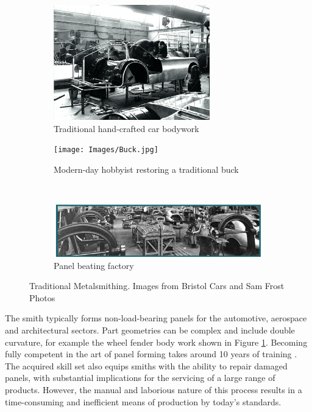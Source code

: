 \begin{figure}[h]
\centering
%
\begin{subfigure}[t]{.45\textwidth}
  \centering
  \includegraphics[height=5cm]{Images/OldCar.png}  
  \caption{Traditional hand-crafted car bodywork}
  \label{fig:OldCar}
\end{subfigure}
\begin{subfigure}[t]{.45\textwidth}
  \centering
  \texttt{[image: Images/Buck.jpg]}  
  \caption{Modern-day hobbyist restoring a traditional buck}
  \label{fig:NewBuck}
\end{subfigure}\\[1ex]
%
\begin{subfigure}{.9\textwidth}
  \centering
  \includegraphics[width=\linewidth]{Images/OldFactory.png}  
  \caption{Panel beating factory}
  \label{fig:OldFactory}
\end{subfigure}
%
\caption{Traditional Metalsmithing. Images from Bristol Cars and Sam Frost Photos}
\label{fig:Background}
\end{figure}

The smith typically forms non-load-bearing panels for the automotive, aerospace and architectural sectors. Part geometries can be complex and include double curvature, for example the wheel fender body work shown in Figure \ref{fig:OldCar}. Becoming fully competent in the art of panel forming takes around 10 years of training \citep{Goodwin2020BehindBeaters}. The acquired skill set also equips smiths with the ability to repair damaged panels, with substantial implications for the servicing of a large range of products. However, the manual and laborious nature of this process results in a time-consuming and inefficient means of production by today's standards.


